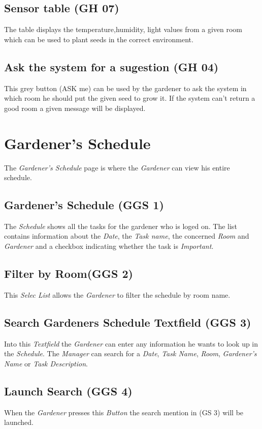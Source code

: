 \subsection{Sensor table (GH 07)}
The table displays the temperature,humidity, light  values from a given room
which can be used to plant seeds in the correct environment.

\subsection{Ask the system for a sugestion (GH 04) }
This grey button (ASK me) can be used by the gardener to ask the system in which
room he should put the given seed to grow it. If the system can't return a good
room a given message will be displayed.

\newpage
\section{Gardener's Schedule}
\label{sec:appendix_GardenersSchedule}
\mbox{} \par
\noindent{}

The \emph{Gardener's Schedule} page is where the \emph{Gardener} can view his
entire schedule.

\subsection{Gardener's Schedule (GGS 1)}
The \emph{Schedule} shows all the tasks for the gardener who is loged on. The
list contains information about the \emph{Date}, the \emph{Task name}, the concerned \emph{Room} and \emph{Gardener} and a checkbox indicating
whether the task is \emph{Important}.

\subsection{Filter by Room(GGS 2)}
This \emph{Selec List} allows the \emph{Gardener} to filter the schedule by room
name.

\subsection{Search Gardeners Schedule Textfield (GGS 3)}
Into this \emph{Textfield} the \emph{Gardener} can enter any information he
wants to look up in the \emph{Schedule}. The \emph{Manager} can search for
a \emph{Date}, \emph{Task Name}, \emph{Room}, \emph{Gardener's Name} or
\emph{Task Description}.

\subsection{Launch Search (GGS 4)}
When the \emph{Gardener} presses this \emph{Button} the search mention in (GS
3) will be launched.
